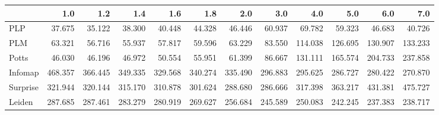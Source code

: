 \begin{tabular}{lrrrrrrrrrrr}
\toprule
{} &     1.0 &     1.2 &     1.4 &     1.6 &     1.8 &     2.0 &     3.0 &     4.0 &     5.0 &     6.0 &     7.0 \\
\midrule
PLP      &  37.675 &  35.122 &  38.300 &  40.448 &  44.328 &  46.446 &  60.937 &  69.782 &  59.323 &  46.683 &  40.726 \\
PLM      &  63.321 &  56.716 &  55.937 &  57.817 &  59.596 &  63.229 &  83.550 & 114.038 & 126.695 & 130.907 & 133.233 \\
Potts    &  46.030 &  46.196 &  46.972 &  50.554 &  55.951 &  61.399 &  86.667 & 131.111 & 165.574 & 204.733 & 237.858 \\
Infomap  & 468.357 & 366.445 & 349.335 & 329.568 & 340.274 & 335.490 & 296.883 & 295.625 & 286.727 & 280.422 & 270.870 \\
Surprise & 321.944 & 320.144 & 315.170 & 310.878 & 301.624 & 288.680 & 286.666 & 317.398 & 363.217 & 431.381 & 475.727 \\
Leiden   & 287.685 & 287.461 & 283.279 & 280.919 & 269.627 & 256.684 & 245.589 & 250.083 & 242.245 & 237.383 & 238.717 \\
\bottomrule
\end{tabular}

